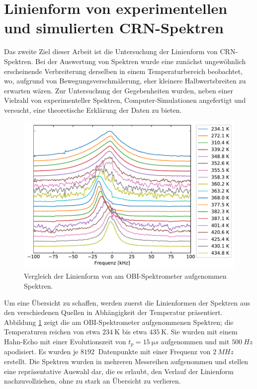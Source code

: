 \section{Linienform von experimentellen und simulierten CRN-Spektren} \label{section:res:spektren}

Das zweite Ziel dieser Arbeit ist die Untersuchung der Linienform von CRN-Spek\-tren. Bei der Auswertung von Spektren wurde eine zunächst ungewöhnlich erscheinende Verbreiterung derselben in einem Temperaturbereich beobachtet, wo, aufgrund von Bewegungsverschmälerung, eher kleinere Halbwertsbreiten zu erwarten wären. Zur Untersuchung der Gegebenheiten wurden, neben einer Vielzahl von experimenteller Spektren, Computer-Simulationen angefertigt und versucht, eine theoretische Erklärung der Daten zu bieten.

\begin{figure}
	\begin{center}
		\includegraphics[width=\textwidth]{graphics/plot/spek_lineshape.pdf}
	\end{center}
	\caption{Vergleich der Linienform von am OBI-Spektrometer aufgenommen Spektren.} \label{fig:res:spek_linienform}
\end{figure}
Um eine Übersicht zu schaffen, werden zuerst die Linienformen der Spektren aus den verschiedenen Quellen in Abhängigkeit der Temperatur präsentiert. Abbildung \ref{fig:res:spek_linienform} zeigt die am OBI-Spektrometer aufgenommenen Spektren; die Temperaturen reichen von etwa $\SI{234}{\kelvin}$ bis etwa $\SI{435}{\kelvin}$. Sie wurden mit einem Hahn-Echo mit einer Evolutionszeit von $t_p = \SI{15}{\micro s}$ aufgenommen und mit $\SI{500}{Hz}$ apodisiert. Es wurden je $\SI{8192}{}$ Datenpunkte mit einer Frequenz von $\SI{2}{MHz}$ erstellt. Die Spektren wurden in mehreren Messreihen aufgenommen und stellen eine repräsentative Auswahl dar, die es erlaubt, den Verlauf der Linienform nachzuvollziehen, ohne zu stark an Übersicht zu verlieren.

